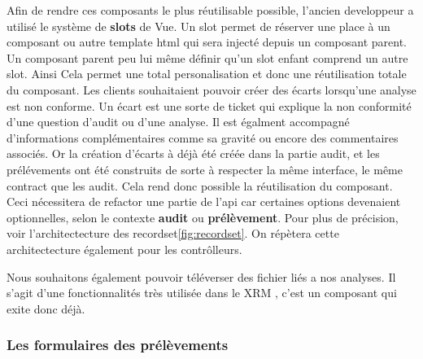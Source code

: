 Afin de rendre ces composants le plus réutilisable possible, l'ancien developpeur a utilisé le système de \textbf{slots}\cite{vueslots} de Vue. Un slot permet de réserver une place à un composant ou autre template html qui sera injecté depuis un composant parent. Un composant parent peu lui même définir qu'un slot enfant comprend un autre slot. Ainsi Cela permet une total personalisation et donc une réutilisation totale du composant. 
Les clients souhaitaient pouvoir créer des écarts lorsqu'une analyse est non conforme.
Un écart est une sorte de ticket qui explique la non conformité d'une question d'audit ou d'une analyse. Il est égalment accompagné d'informations complémentaires comme sa gravité ou encore des commentaires associés. Or la création d'écarts à déjà été créée dans la partie audit, et les prélévements ont été construits de sorte à respecter la même interface, le même contract que les audit. Cela rend donc possible la  réutilisation du composant. Ceci nécessitera de refactor une partie de l'api car certaines options devenaient optionnelles, selon le contexte \textbf{audit} ou \textbf{prélèvement}. Pour plus de précision, voir l'architectecture des recordset\ref{fig:recordset}. On répètera cette architectecture également pour les contrôlleurs.

Nous souhaitons également pouvoir téléverser des fichier liés a nos analyses. Il s'agit d'une fonctionnalités très utilisée dans le XRM , c'est un composant qui exite donc déjà. 

\subsubsection{Les formulaires des prélèvements}

